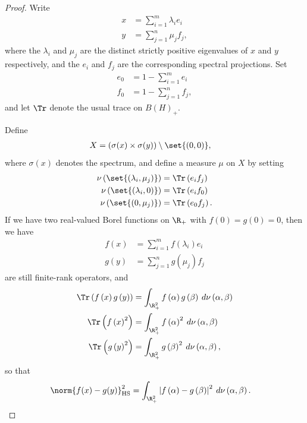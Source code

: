 \documentclass[10pt]{mypackage}
\begin{document}
\begin{proof}
  Write
  \begin{align*}
    x &= \sum_{i=1}^{m} \lambda_i e_i\\
    y &= \sum_{j=1}^{n}\mu_j f_j,
  \end{align*}
  where the $\lambda_i$ and $\mu_j$ are the distinct strictly positive eigenvalues of $x$ and $y$ respectively, and the $e_i$ and $f_j$ are the corresponding spectral projections. Set
  \begin{align*}
    e_0 &= 1-\sum_{i=1}^{m}e_i\\
    f_0 &= 1-\sum_{j=1}^{n} f_j,
  \end{align*}
  and let $\Tr$ denote the usual trace on $B\left( H \right)_{+}$.

  Define
  \begin{align*}
    X &= \left( \sigma(x)\times \sigma(y) \right)\setminus \set{\left( 0,0 \right)},
  \end{align*}
  where $\sigma(x)$ denotes the spectrum, and define a measure $\mu$ on $X$ by setting
  \begin{align*}
    \nu\left( \set{\left( \lambda_i,\mu_j \right)} \right) &= \Tr\left( e_if_j \right)\\
    \nu\left( \set{\left( \lambda_i,0 \right)} \right) &= \Tr\left( e_if_0 \right)\\
    \nu\left( \set{\left( 0,\mu_j \right)} \right) &= \Tr\left( e_0f_j \right).
  \end{align*}
  If we have two real-valued Borel functions on $\R_{+}$ with $f(0) = g(0) = 0$, then we have
  \begin{align*}
    f(x) &= \sum_{i=1}^{m}f\left( \lambda_i \right)e_i\\
    g\left( y \right) &= \sum_{j=1}^{n}g\left( \mu_j \right)f_j
  \end{align*}
  are still finite-rank operators, and
  \begin{align*}
    \Tr\left( f\left( x \right)g\left( y \right) \right) &= \int_{\R_{+}^{2}}^{} f\left( \alpha \right)g\left( \beta \right)\:d\nu\left( \alpha,\beta \right)\\
    \Tr\left( f\left( x \right)^2 \right) &= \int_{\R_{+}^{2}}^{} f\left( \alpha \right)^2\:d\nu\left( \alpha,\beta \right)\\
    \Tr\left( g\left( y \right)^2 \right) &= \int_{\R^{2}_{+}}^{} g\left( \beta \right)^2\:d\nu\left( \alpha,\beta \right),
  \end{align*}
  so that
  \begin{align*}
    \norm{f(x)-g(y)}_{\operatorname{HS}}^2 &= \int_{\R^2_{+}}^{} \left\vert f\left( \alpha \right)-g\left( \beta \right) \right\vert^2\:d\nu\left( \alpha,\beta \right).
  \end{align*}
\end{proof}
\end{document}
